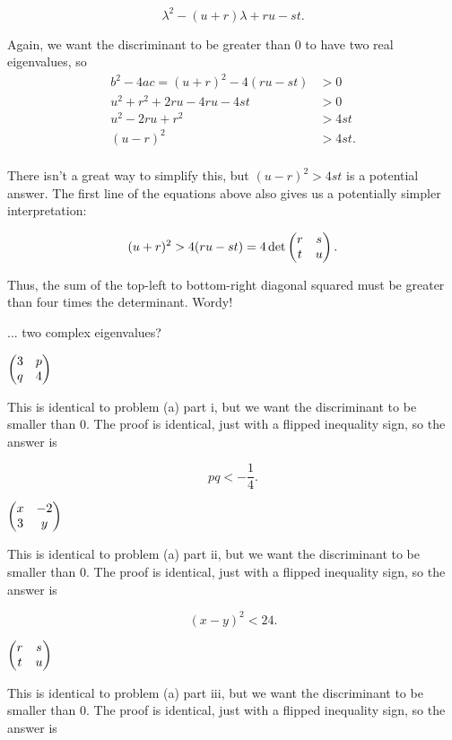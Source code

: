 \documentclass[../gatm_answers.tex]{subfiles}
\begin{document}
$$\lambda^2 - (u+r)\lambda + ru - st.$$

Again, we want the discriminant to be greater than $0$ to have two real eigenvalues, so
\begin{align*}
b^2-4ac=(u+r)^2 - 4(ru-st)  &> 0 \\
u^2 + r^2 + 2ru - 4ru - 4st &> 0 \\
u^2 - 2ru + r^2 &> 4st \\
(u-r)^2 &> 4st. \\
\end{align*}

There isn't a great way to simplify this, but $(u-r)^2 > 4st$ is a potential answer. The first line of the equations above also gives us a potentially simpler interpretation:

$$(u+r)^2 > 4(ru-st) = 4\det \begin{pmatrix} r & s \\ t & u \end{pmatrix}.$$

Thus, the sum of the top-left to bottom-right diagonal squared must be greater than four times the determinant. Wordy!

\begin{inner_problem}
\item ... two complex eigenvalues?
\end{inner_problem}

\begin{iinner_problem}[start=1]
\item $\begin{pmatrix} 3 & p \\ q & 4 \end{pmatrix}$
\end{iinner_problem}

This is identical to problem (a) part i, but we want the discriminant to be smaller than $0$. The proof is identical, just with a flipped inequality sign, so the answer is

$$pq < -\frac{1}{4}.$$

\begin{iinner_problem}
\item $\begin{pmatrix} x & -2 \\ 3 & y \end{pmatrix}$
\end{iinner_problem}

This is identical to problem (a) part ii, but we want the discriminant to be smaller than $0$. The proof is identical, just with a flipped inequality sign, so the answer is

$$(x-y)^2 < 24.$$

\begin{iinner_problem}
\item $\begin{pmatrix} r & s \\ t & u \end{pmatrix}$
\end{iinner_problem}

This is identical to problem (a) part iii, but we want the discriminant to be smaller than $0$. The proof is identical, just with a flipped inequality sign, so the answer is
\end{document}
